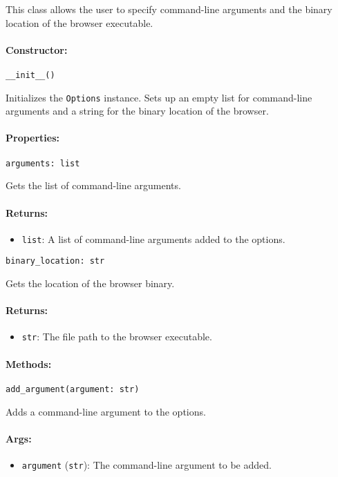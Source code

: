 \documentclass{article}
\begin{document}
\noindent This class allows the user to specify command-line arguments and the binary location of the browser executable.

\paragraph{Constructor:}
\noindent\texttt{\_\_init\_\_()}

\noindent Initializes the \texttt{Options} instance. Sets up an empty list for command-line arguments and a string for the binary location of the browser.

\paragraph{Properties:}
\noindent\texttt{arguments: list}

\noindent Gets the list of command-line arguments.

\paragraph{Returns:}
\begin{itemize}
    \item \texttt{list}: A list of command-line arguments added to the options.
\end{itemize}

\noindent\texttt{binary\_location: str}

\noindent Gets the location of the browser binary.

\paragraph{Returns:}
\begin{itemize}
    \item \texttt{str}: The file path to the browser executable.
\end{itemize}

\paragraph{Methods:}
\noindent\texttt{add\_argument(argument: str)}

\noindent Adds a command-line argument to the options.

\paragraph{Args:}
\begin{itemize}
    \item \texttt{argument} (\texttt{str}): The command-line argument to be added.
\end{itemize}
\end{document}
